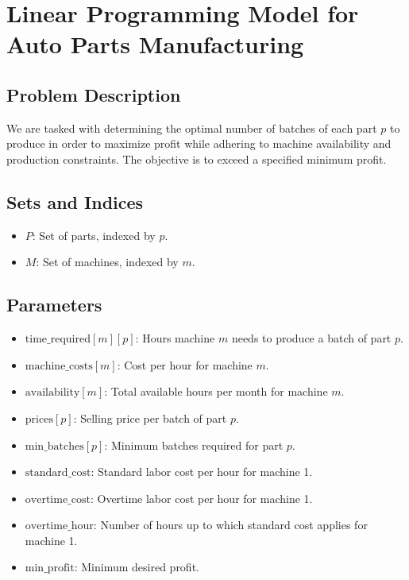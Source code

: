 \documentclass{article}
\begin{document}
\section*{Linear Programming Model for Auto Parts Manufacturing}

\subsection*{Problem Description}

We are tasked with determining the optimal number of batches of each part \( p \) to produce in order to maximize profit while adhering to machine availability and production constraints. The objective is to exceed a specified minimum profit.

\subsection*{Sets and Indices}
\begin{itemize}
    \item \( P \): Set of parts, indexed by \( p \).
    \item \( M \): Set of machines, indexed by \( m \).
\end{itemize}

\subsection*{Parameters}
\begin{itemize}
    \item \( \text{time\_required}[m][p] \): Hours machine \( m \) needs to produce a batch of part \( p \).
    \item \( \text{machine\_costs}[m] \): Cost per hour for machine \( m \).
    \item \( \text{availability}[m] \): Total available hours per month for machine \( m \).
    \item \( \text{prices}[p] \): Selling price per batch of part \( p \).
    \item \( \text{min\_batches}[p] \): Minimum batches required for part \( p \).
    \item \( \text{standard\_cost} \): Standard labor cost per hour for machine 1.
    \item \( \text{overtime\_cost} \): Overtime labor cost per hour for machine 1.
    \item \( \text{overtime\_hour} \): Number of hours up to which standard cost applies for machine 1.
    \item \( \text{min\_profit} \): Minimum desired profit.
\end{itemize}
\end{document}
